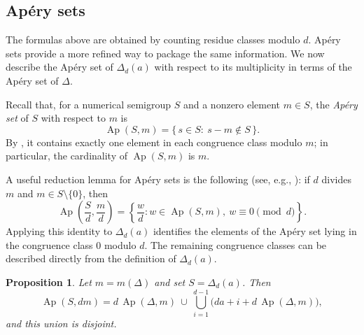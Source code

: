 \documentclass[12pt,a4paper]{amsart}
\newtheorem{proposition}[theorem]{Proposition}
\theoremstyle{definition}
\theoremstyle{remark}
\begin{document}
\subsection{Ap\'ery sets}

The formulas above are obtained by counting residue classes modulo $d$. Ap\'ery sets
provide a more refined way to package the same information. We now describe the Ap\'ery
set of $\Delta_d(a)$ with respect to its multiplicity in terms of the Ap\'ery set of $\Delta$.

Recall that, for a numerical semigroup $S$ and a nonzero element $m\in S$, the \emph{Ap\'ery set} of $S$ with respect to $m$ is
\[
\operatorname{Ap}(S,m)=\{\,s\in S:\ s-m\notin S\,\}.
\]
By \cite[Lemma~2.4]{book}, it contains exactly one element in each congruence class modulo $m$; in particular, the cardinality of $\operatorname{Ap}(S,m)$ is $m$.

A useful reduction lemma for Ap\'ery sets is the following (see, e.g., \cite[Theorem 27]{australian}): if $d$ divides $m$ and $m\in S\setminus\{0\}$, then \[\operatorname{Ap}\left(\frac{S}{d},\frac{m}{d}\right)=\left\{\frac{w}{d}: w\in \operatorname{Ap}(S,m),\ w\equiv 0 \pmod d\right\}.\] Applying this identity to $\Delta_d(a)$ identifies the elements of the Ap\'ery set lying in the congruence class $0$ modulo $d$. The remaining congruence classes can be described directly from the definition of $\Delta_d(a)$.

\begin{proposition}
Let $m=m(\Delta)$ and set $S=\Delta_d(a)$. Then
\[
\operatorname{Ap}(S,dm)
=
d\,\operatorname{Ap}(\Delta,m)
\ \cup\
\bigcup_{i=1}^{d-1}
\bigl(da+i+d\,\operatorname{Ap}(\Delta,m)\bigr),
\]
and this union is disjoint.
\end{proposition}
\end{document}
